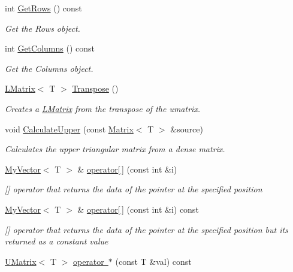 \begin{DoxyCompactItemize}
int \mbox{\hyperlink{class_u_matrix_ae261286236cb23a0dfa1296591f4c3ad}{Get\+Rows}} () const
\begin{DoxyCompactList}\small\item\em Get the Rows object. \end{DoxyCompactList}\item 
int \mbox{\hyperlink{class_u_matrix_a4065961abb79fd43d7abaf10c47e73d8}{Get\+Columns}} () const
\begin{DoxyCompactList}\small\item\em Get the Columns object. \end{DoxyCompactList}\item 
\mbox{\hyperlink{class_l_matrix}{L\+Matrix}}$<$ T $>$ \mbox{\hyperlink{class_u_matrix_a7b8f7cc5acf42e18dcaabbc49533c6b8}{Transpose}} ()
\begin{DoxyCompactList}\small\item\em Creates a \mbox{\hyperlink{class_l_matrix}{L\+Matrix}} from the transpose of the umatrix. \end{DoxyCompactList}\item 
void \mbox{\hyperlink{class_u_matrix_a63af4ca40c18c71bd0609d4511779852}{Calculate\+Upper}} (const \mbox{\hyperlink{class_matrix}{Matrix}}$<$ T $>$ \&source)
\begin{DoxyCompactList}\small\item\em Calculates the upper triangular matrix from a dense matrix. \end{DoxyCompactList}\item 
\mbox{\hyperlink{class_my_vector}{My\+Vector}}$<$ T $>$ \& \mbox{\hyperlink{class_u_matrix_a0dea1e82fbf5ae67bec479c070b185dc}{operator\mbox{[}$\,$\mbox{]}}} (const int \&i)
\begin{DoxyCompactList}\small\item\em \mbox{[}\mbox{]} operator that returns the data of the pointer at the specified position \end{DoxyCompactList}\item 
\mbox{\hyperlink{class_my_vector}{My\+Vector}}$<$ T $>$ \& \mbox{\hyperlink{class_u_matrix_ab0ad5eda96c9a8bb9ca8c69d4bb8d5f8}{operator\mbox{[}$\,$\mbox{]}}} (const int \&i) const
\begin{DoxyCompactList}\small\item\em \mbox{[}\mbox{]} operator that returns the data of the pointer at the specified position but its returned as a constant value \end{DoxyCompactList}\item 
\mbox{\hyperlink{class_u_matrix}{U\+Matrix}}$<$ T $>$ \mbox{\hyperlink{class_u_matrix_a7b1875cfc49b374875dac2a58948f3ac}{operator $\ast$}} (const T \&val) const

\end{DoxyCompactItemize}

